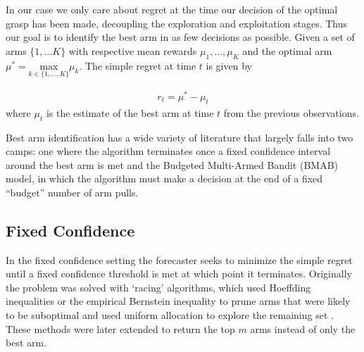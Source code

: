 \documentclass[journal,transmag]{IEEEtran}%
\begin{document}
In our case we only care about regret at the time our decision of the optimal grasp has been made, decoupling the exploration and exploitation stages. 
Thus our goal is to identify the best arm in as few decisions as possible.
Given a set of arms $\lbrace 1,...K \rbrace$ with respective mean rewards $\mu_1, ..., \mu_K$ and the optimal arm $\mu^* = \underset{k\in\lbrace 1, ..., K \rbrace}{\mbox{max}} \mu_k$.
The simple regret at time $t$ is given by

\vspace{-2ex}
\begin{align}\label{eq:simple_regret}
r_t = \mu^* - \mu_t
\end{align}
\noindent where $\mu_t$ is the estimate of the best arm at time $t$ from the previous observations. 

Best arm identification has a wide variety of literature that largely falls into two camps: one where the algorithm terminates once a fixed confidence interval around the best arm is met and the Budgeted Multi-Armed Bandit (BMAB) model, in which the algorithm must make a decision at the end of a fixed ``budget'' number of arm pulls.

\subsection{Fixed Confidence}
In the fixed confidence setting the forecaster seeks to minimize the simple regret until a fixed confidence threshold is met at which point it terminates. Originally the problem was solved with `racing' algorithms, which used Hoeffding inequalities or the empirical Bernstein inequality to prune arms that were likely to be suboptimal and used uniform allocation to explore the remaining set \cite{maron1993hoeffding} \cite{mnih2008empirical}. These methods were later extended to return the top $m$ arms instead of only the best arm\cite{gabillon2012best}.
\end{document}
